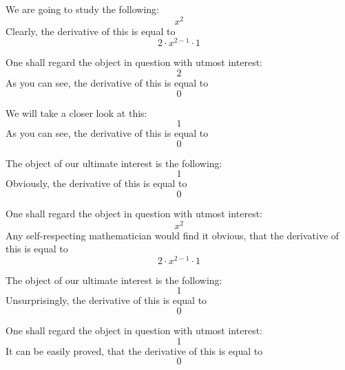 \documentclass{article}
\begin{document}
We are going to study the following:
\begin{equation}
x ^{2 } 
\end{equation}
Clearly, the derivative of this is equal to
\begin{equation}
2 \cdot x ^{2 - 1 } \cdot 1 
\end{equation}

One shall regard the object in question with utmost interest:
\begin{equation}
2 
\end{equation}
As you can see, the derivative of this is equal to
\begin{equation}
0 
\end{equation}

We will take a closer look at this:
\begin{equation}
1 
\end{equation}
As you can see, the derivative of this is equal to
\begin{equation}
0 
\end{equation}

The object of our ultimate interest is the following:
\begin{equation}
1 
\end{equation}
Obviously, the derivative of this is equal to
\begin{equation}
0 
\end{equation}

One shall regard the object in question with utmost interest:
\begin{equation}
x ^{2 } 
\end{equation}
Any self-respecting mathematician would find it obvious, that the derivative of this is equal to
\begin{equation}
2 \cdot x ^{2 - 1 } \cdot 1 
\end{equation}

The object of our ultimate interest is the following:
\begin{equation}
1 
\end{equation}
Unsurprisingly, the derivative of this is equal to
\begin{equation}
0 
\end{equation}

One shall regard the object in question with utmost interest:
\begin{equation}
1 
\end{equation}
It can be easily proved, that the derivative of this is equal to
\begin{equation}
0 
\end{equation}
\end{document}
